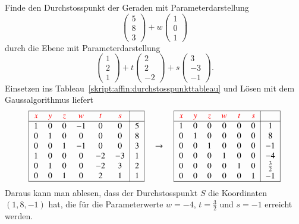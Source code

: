 \begin{beispiel}
Finde den Durchstosspunkt der Geraden mit Parameterdarstellung
\[
\begin{pmatrix} 5\\8\\3 \end{pmatrix}
+
w\begin{pmatrix} 1\\0\\1 \end{pmatrix}
\]
durch die Ebene mit Parameterdarstellung
\[
\begin{pmatrix}1\\2\\1 \end{pmatrix}
+
t\begin{pmatrix}2\\2\\-2\end{pmatrix}
+
s\begin{pmatrix}3\\-3\\-1\end{pmatrix}.
\]
Einsetzen ins Tableau~\ref{skript:affin:durchstosspunkttableau}
und Lösen mit dem Gaussalgorithmus liefert
\[
\begin{tabular}{|>{$}c<{$}>{$}c<{$}>{$}c<{$}>{$}c<{$}>{$}c<{$}>{$}c<{$}|>{$}c<{$}|}
\hline
\color{red}x&\color{red}y&\color{red}z&\color{red}w&\color{red}t&\color{red}s&\\
\hline
1&0&0&-1& 0& 0&5\\
0&1&0& 0& 0& 0&8\\
0&0&1&-1& 0& 0&3\\
1&0&0& 0&-2&-3&1\\
0&1&0& 0&-2& 3&2\\
0&0&1& 0& 2& 1&1\\
\hline
\end{tabular}
\quad\rightarrow\quad
\begin{tabular}{|>{$}c<{$}>{$}c<{$}>{$}c<{$}>{$}c<{$}>{$}c<{$}>{$}c<{$}|>{$}c<{$}|}
\hline
\color{red}x&\color{red}y&\color{red}z&\color{red}w&\color{red}t&\color{red}s&\\
\hline
1&0&0& 0& 0& 0& 1\\
0&1&0& 0& 0& 0& 8\\
0&0&1& 0& 0& 0&-1\\
0&0&0& 1& 0& 0&-4\\
0&0&0& 0& 1& 0& \frac32\\
0&0&0& 0& 0& 1&-1\\
\hline
\end{tabular}
\]
Daraus kann man ablesen, dass der Durchstosspunkt $S$ die Koordinaten
$(1,8,-1)$ hat, die für die Parameterwerte $w=-4$, $t=\frac32$ und $s=-1$
erreicht werden.
\end{beispiel}


